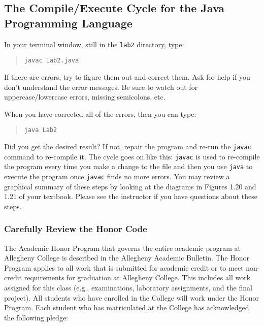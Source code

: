 \subsection*{The Compile/Execute Cycle for the Java Programming Language}
In your terminal window, still in the {\tt lab2} directory, type:

\vspace*{-.1in}
\begin{quote}
{\tt javac Lab2.java}
\end{quote}
\vspace*{-.1in}

If there are errors, try to figure them out and correct them. Ask for help if
you don't understand the error messages. Be sure to watch out for
uppercase/lowercase errors, missing semicolons, etc.

When you have corrected all of the errors, then you can type:

\vspace*{-.1in}
\begin{quote}
{\tt java Lab2}
\end{quote}
\vspace*{-.1in}

Did you get the desired result? If not, repair the program and re-run the {\tt javac} command to re-compile it.  The
cycle goes on like this: {\tt javac} is used to re-compile the program every time you make a change to the file and then
you use {\tt java} to execute the program once {\tt javac} finds no more errors. You may review a graphical summary of
these steps by looking at the diagrams in Figures 1.20 and 1.21 of your textbook. Please see the instructor if you
have questions about these steps.

\vspace*{-.11in}
\subsubsection*{Carefully Review the Honor Code}

The Academic Honor Program that governs the entire academic program at Allegheny College is described in the Allegheny
Academic Bulletin.  The Honor Program applies to all work that is submitted for academic credit or to meet non-credit
requirements for graduation at Allegheny College.  This includes all work assigned for this class (e.g., examinations,
  laboratory assignments, and the final project).  All students who have enrolled in the College will work under the Honor
Program.  Each student who has matriculated at the College has acknowledged the following pledge:

